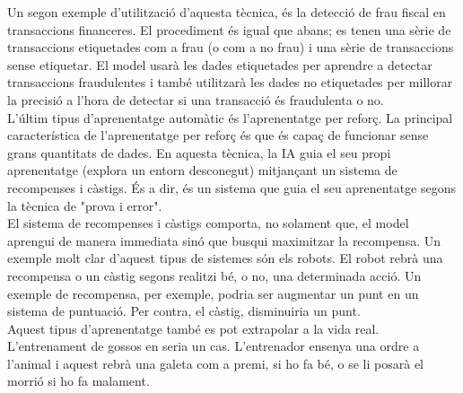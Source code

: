 \documentclass[a4paper,12pt]{article}
\begin{document}
Un segon exemple d'utilització d'aquesta tècnica, és la detecció de frau fiscal en transaccions financeres. El procediment és igual que abans; es tenen una sèrie de transaccions etiquetades com a frau (o com a no frau) i una sèrie de transaccions sense etiquetar. El model usarà les dades etiquetades per aprendre a detectar transaccions fraudulentes i també utilitzarà les dades no etiquetades per millorar la precisió a l'hora de detectar si una transacció és fraudulenta o no.\\
L'últim tipus d'aprenentatge automàtic és l'aprenentatge per reforç. La principal característica de l'aprenentatge per reforç és que és capaç de funcionar sense grans quantitats de dades. En aquesta tècnica, la IA guia el seu propi aprenentatge (explora un entorn desconegut) mitjançant un sistema de recompenses i càstigs. És a dir, és un sistema que guia el seu aprenentatge segons la tècnica de "prova i error".\\
El sistema de recompenses i càstigs comporta, no solament que, el model aprengui de manera immediata sinó que busqui maximitzar la recompensa.
Un exemple molt clar d'aquest tipus de sistemes són els robots. El robot rebrà una recompensa o un càstig segons realitzi bé, o no, una determinada acció. Un exemple de recompensa, per exemple, podria ser augmentar un punt en un sistema de puntuació. Per contra, el càstig, disminuiria un punt.\\
Aquest tipus d'aprenentatge també es pot extrapolar a la vida real. L'entrenament de gossos en seria un cas. L'entrenador ensenya una ordre a l'animal i aquest rebrà una galeta com a premi, si ho fa bé, o se li posarà el morrió si ho fa malament.
\end{document}
